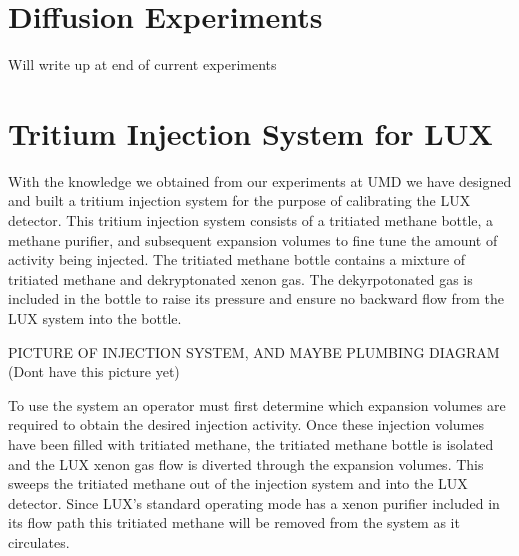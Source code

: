 \documentclass[a4paper,12pt]{article}
\begin{document}
\section{Diffusion Experiments}

Will write up at end of current experiments

\section{Tritium Injection System for LUX}

With the knowledge we obtained from our experiments at UMD we have designed and built a tritium injection system for the purpose of calibrating the LUX detector.  This tritium injection system consists of a tritiated methane bottle, a methane purifier, and subsequent expansion volumes to fine tune the amount of activity being injected.  The tritiated methane bottle contains a mixture of tritiated methane and dekryptonated xenon gas.  The dekyrpotonated gas is included in the bottle to raise its pressure and ensure no backward flow from the LUX system into the bottle.

PICTURE OF INJECTION SYSTEM, AND MAYBE PLUMBING DIAGRAM (Dont have this picture yet)

To use the system an operator must first determine which expansion volumes are required to obtain the desired injection activity.  Once these injection volumes have been filled with tritiated methane, the tritiated methane bottle is isolated and the LUX xenon gas flow is diverted through the expansion volumes.  This sweeps the tritiated methane out of the injection system and into the LUX detector.  Since LUX's standard operating mode has a xenon purifier included in its flow path this tritiated methane will be removed from the system as it circulates. 
\end{document}
